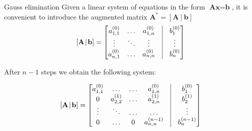 \documentclass[xcolor={dvipsnames,rgb}, aspectratio=169]{beamer}
\begin{document}
\begin{frame}{Gauss elimination}
\vspace{-.5cm}
Given a linear system of equations in the form $\textbf{A}\textbf{x} = \textbf{b}$, it is
convenient to introduce the augmented matrix
$\textbf{A}^{\textbf{*}} = \left[\textbf{A}\:|\:\textbf{b}\right]$
\vspace{-.2cm}
\begin{equation*}
\left[\textbf{A}\:\vline \:\textbf{b}\right] = 
\begin{bmatrix}
   a_{1,1}^{(0)} & \ldots & a_{1,n}^{(0)} & \vline & b_{1}^{(0)} \\
   \vdots        & \ddots & \vdots        & \vline & \vdots \\
   a_{n,1}^{(0)} & \ldots & a_{n,n}^{(0)} & \vline & b_{n}^{(0)} \\
\end{bmatrix}
\end{equation*}

After $n-1$ steps we obtain the following system:

\begin{equation*}
\left[\textbf{A} \: \vline \: \textbf{b}\right] = 
\begin{bmatrix}
   a_{1,1}^{(0)} & \ldots        & \ldots & a_{1,n}^{(0)}   & \vline & b_{1}^{(0)}   \\
   0             & a_{2,2}^{(1)} & \ldots & a_{2,n}^{(1)}   & \vline & b_{2}^{(1)}   \\
   \vdots        & \ddots        & \ldots & \ldots          & \vline & \vdots        \\
   0             & \ldots        & 0      & a_{n,n}^{(n-1)} & \vline & b_{n}^{(n-1)} \\
\end{bmatrix}
\end{equation*}
\end{frame}
\end{document}
